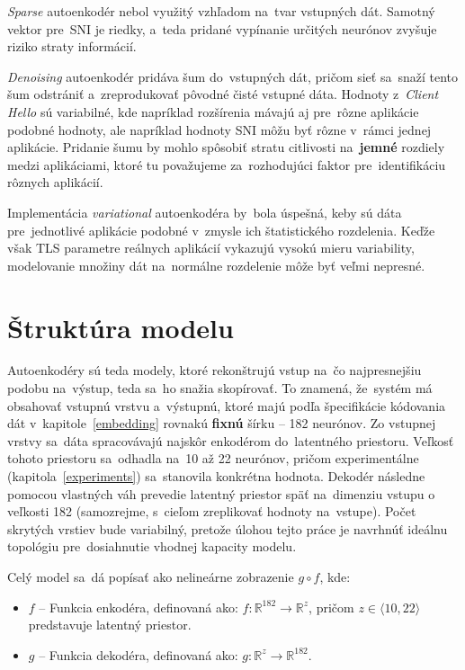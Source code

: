 \textit{Sparse} autoenkodér nebol využitý vzhľadom na~tvar vstupných dát. Samotný vektor pre~SNI je riedky, a~teda pridané vypínanie určitých neurónov zvyšuje riziko straty informácií.

\textit{Denoising} autoenkodér pridáva šum do~vstupných dát, pričom sieť sa~snaží tento šum odstrániť a~zreprodukovať pôvodné čisté vstupné dáta. Hodnoty z~\textit{Client Hello} sú variabilné, kde napríklad rozšírenia mávajú aj pre~rôzne aplikácie podobné hodnoty, ale napríklad hodnoty SNI môžu byť rôzne v~rámci jednej aplikácie. Pridanie šumu by mohlo spôsobiť stratu citlivosti na~\textbf{jemné} rozdiely medzi aplikáciami, ktoré tu považujeme za~rozhodujúci faktor pre~identifikáciu rôznych aplikácií.

Implementácia \textit{variational} autoenkodéra by~bola úspešná, keby sú dáta pre~jednotlivé aplikácie podobné v~zmysle ich štatistického rozdelenia. Keďže však TLS parametre reálnych aplikácií vykazujú vysokú mieru variability, modelovanie množiny dát na~normálne rozdelenie môže byť veľmi nepresné.

\section{Štruktúra modelu}
Autoenkodéry sú teda modely, ktoré rekonštrujú vstup na~čo najpresnejšiu podobu na~výstup, teda sa~ho snažia skopírovať. To znamená, že~systém má obsahovať vstupnú vrstvu a~výstupnú, ktoré majú podľa špecifikácie kódovania dát v~kapitole~\ref{embedding} rovnakú \textbf{fixnú} šírku -- 182 neurónov. Zo vstupnej vrstvy sa~dáta spracovávajú najskôr enkodérom do~latentného priestoru. Veľkosť tohoto priestoru sa~odhadla na~10 až 22 neurónov, pričom experimentálne (kapitola~\ref{experiments}) sa~stanovila konkrétna hodnota. Dekodér následne pomocou vlastných váh prevedie latentný priestor späť na~dimenziu vstupu o veľkosti 182 (samozrejme, s~cieľom zreplikovať hodnoty na~vstupe). Počet skrytých vrstiev bude variabilný, pretože úlohou tejto práce je navrhnúť ideálnu topológiu pre~dosiahnutie vhodnej kapacity modelu. 

Celý model sa~dá popísať ako nelineárne zobrazenie $g \circ f$, kde:
\begin{itemize}
    \item $f$ -- Funkcia enkodéra, definovaná ako: $f: \mathbb{R}^{182} \rightarrow \mathbb{R}^z$, pričom $z \in \langle 10, 22 \rangle $ predstavuje latentný priestor.
    \item $g$ -- Funkcia dekodéra, definovaná ako: $g: \mathbb{R}^z \rightarrow \mathbb{R}^{182}$.
\end{itemize}

